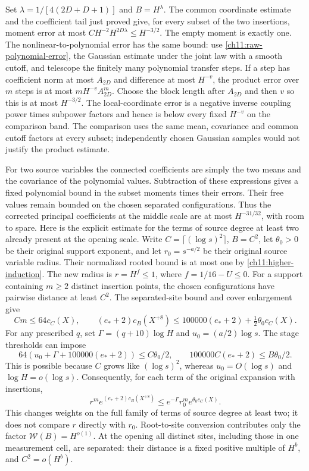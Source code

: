 Set $\lambda=1/[4(2D+D+1)]$ and $B=H^\lambda$.
The common coordinate estimate and the coefficient tail just
proved give, for every subset of the two insertions, moment
error at most $C H^{-2}H^{2D\lambda}\le H^{-3/2}$.
The empty moment is exactly one.
The nonlinear-to-polynomial error has the same bound:
use \eqref{ch11:raw-polynomial-error}, the
Gaussian estimate under the joint law with a smooth cutoff, and telescope the finitely many polynomial
transfer steps. If a step has coefficient norm at most
$A_{2D}$ and difference at most $H^{-v}$, the product error
over $m$ steps is at most $mH^{-v}A_{2D}^m$.
Choose the block length after $A_{2D}$ and then $v$ so this is
at most $H^{-3/2}$. The local-coordinate error is a negative
inverse coupling power times subpower factors and hence is below every
fixed $H^{-v}$ on the comparison band.
The comparison uses the same mean, covariance and common
cutoff factors at every subset; independently chosen Gaussian
samples would not justify the product estimate.

For two source variables the connected coefficients are simply the two
means and the covariance of the polynomial values. Subtraction
of these expressions gives a fixed polynomial bound in the
subset moments times their errors. Their free values remain
bounded on the chosen separated configurations.
Thus the corrected principal coefficients at the middle scale
are at most $H^{-31/32}$, with room to spare.
Here is the explicit estimate for the terms of source degree at least two already present
at the opening scale. Write $C=\lceil(\log s)^2\rceil$, $B=C^2$,
let $\theta_0>0$ be their original support exponent, and let
$r_0=s^{-a/2}$ be their original source variable radius. Their normalized
rooted bound is at most one by \eqref{ch11:higher-induction}.
The new radius is $r=H^f\le1$, where $f=1/16-U\le0$.
For a support containing $m\ge2$ distinct insertion points, the
chosen configurations have pairwise distance at least $C^2$.
The separated-site bound and cover enlargement give
\[
 Cm\le64c_C(X),\qquad
 (e_*+2)c_B(X^{+8})
 \le100000(e_*+2)+\tfrac12\theta_0c_C(X).
\]
For any prescribed $q$, set
$\Gamma=(q+10)\log H$ and $u_0=(a/2)\log s$.
The stage thresholds can impose
\[
 64(u_0+\Gamma+100000(e_*+2))\le C\theta_0/2,\qquad
 100000C(e_*+2)\le B\theta_0/2.
\]
This is possible because $C$ grows like $(\log s)^2$,
whereas $u_0=O(\log s)$ and $\log H=o(\log s)$.
Consequently, for each term of the original expansion with insertions,
\begin{equation}\label{ch11:opening-higher-weight}
 r^m e^{(e_*+2)c_B(X^{+8})}
 \le e^{-\Gamma}r_0^m e^{\theta_0c_C(X)}.
\end{equation}
This changes weights on the full family of terms of source degree at least two;
it does not compare $r$ directly with $r_0$.
Root-to-site conversion contributes only the factor $\mathcal W(B)=H^{o(1)}$.
At the opening all distinct sites, including those in one
measurement cell, are separated: their distance is a fixed
positive multiple of $H^b$, and $C^2=o(H^b)$.

